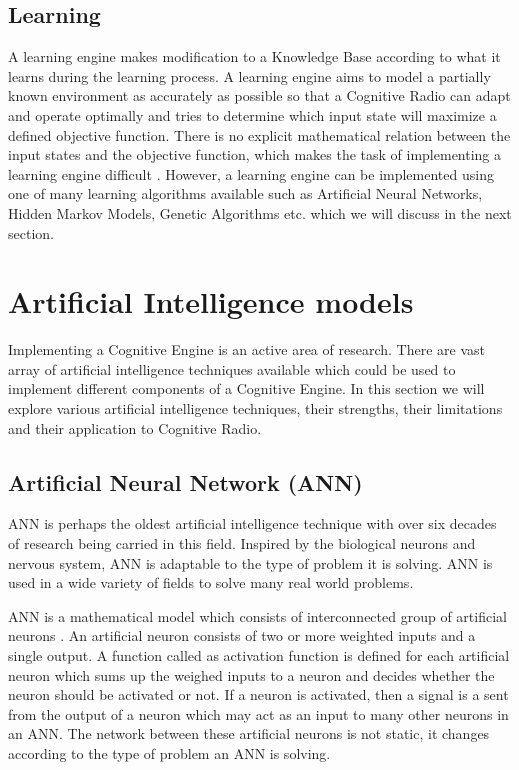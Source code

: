 \documentclass[conference]{IEEEtran}
\begin{document}
\subsection{Learning}
	A learning engine makes modification to a Knowledge Base according to what it learns during the learning process. A learning engine aims to model a partially known environment as accurately as possible so that a Cognitive Radio can adapt and operate optimally and tries to determine which input state will maximize a defined objective function. There is no explicit mathematical relation between the input states and the objective function, which makes the task of implementing a learning engine difficult \cite{4}. However, a learning engine can be implemented using one of many learning algorithms available such as Artificial Neural Networks, Hidden Markov Models, Genetic Algorithms etc. which we will discuss in the next section.


\section{Artificial Intelligence models}
	Implementing a Cognitive Engine is an active area of research. There are vast array of artificial intelligence techniques available which could be used to implement different components of a Cognitive Engine. In this section we will explore various artificial intelligence techniques, their strengths, their limitations and their application to Cognitive Radio.

\subsection{Artificial Neural Network (ANN)}
	ANN is perhaps the oldest artificial intelligence technique with over six decades of research being carried in this field. Inspired by the biological neurons and nervous system, ANN is adaptable to the type of problem it is solving. ANN is used in a wide variety of fields to solve many real world problems. 
    
    ANN is a mathematical model which consists of interconnected group of artificial neurons \cite{6}. An artificial neuron consists of two or more weighted inputs and a single output. A function called as activation function is defined for each artificial neuron which sums up the weighed inputs to a neuron and decides whether the neuron should be activated or not. If a neuron is activated, then a signal is a sent from the output of a neuron which may act as an input to many other neurons in an ANN. The network between these artificial neurons is not static, it changes according to the type of problem an ANN is solving. 
    
\end{document}
